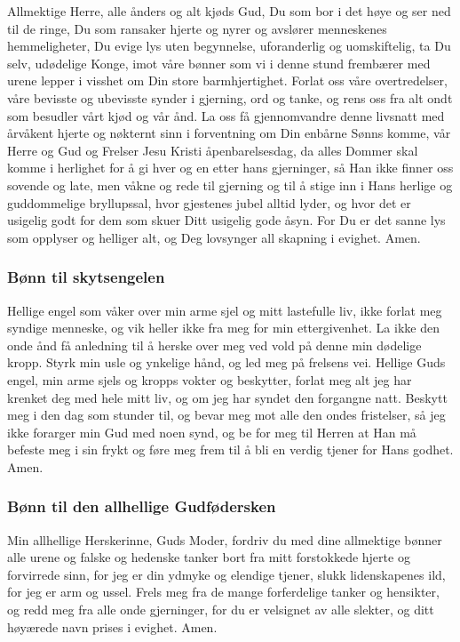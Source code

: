 Allmektige Herre, alle ånders og alt kjøds Gud, Du som bor i det høye og ser ned til de ringe, Du som ransaker hjerte og nyrer og avslører menneskenes hemmeligheter, Du evige lys uten begynnelse, uforanderlig og uomskiftelig, ta Du selv, udødelige Konge, imot våre bønner som vi i denne stund frembærer med urene lepper i visshet om Din store barmhjertighet. Forlat oss våre overtredelser, våre bevisste og ubevisste synder i gjerning, ord og tanke, og rens oss fra alt ondt som besudler vårt kjød og vår ånd. La oss få gjennomvandre denne livsnatt med årvåkent hjerte og nøkternt sinn i forventning om Din enbårne Sønns komme, vår Herre og Gud og Frelser Jesu Kristi åpenbarelsesdag, da alles Dommer skal komme i herlighet for å gi hver og en etter hans gjerninger, så Han ikke finner oss sovende og late, men våkne og rede til gjerning og til å stige inn i Hans herlige og guddommelige bryllupssal, hvor gjestenes jubel alltid lyder, og hvor det er usigelig godt for dem som skuer Ditt usigelig gode åsyn. For Du er det sanne lys som opplyser og helliger alt, og Deg lovsynger all skapning i evighet. Amen.

\subsubsection{Bønn til skytsengelen }

Hellige engel som våker over min arme sjel og mitt lastefulle liv, ikke forlat meg syndige menneske, og vik heller ikke fra meg for min ettergivenhet. 
La ikke den onde ånd få anledning til å herske over meg ved vold på denne min dødelige kropp. Styrk min usle og ynkelige hånd, og led meg på frelsens vei. Hellige Guds engel, min arme sjels og kropps vokter og beskytter, forlat meg alt jeg har krenket deg med hele mitt liv, og om jeg har syndet den forgangne natt. Beskytt meg i den dag som stunder til, og bevar meg mot alle den ondes fristelser, så jeg ikke forarger min Gud med noen synd, og be for meg til Herren at Han må befeste meg i sin frykt og føre meg frem til å bli en verdig tjener for Hans godhet. Amen. 

\subsubsection{Bønn til den allhellige Gudfødersken}

Min allhellige Herskerinne, Guds Moder, fordriv du med dine allmektige bønner alle urene og falske og hedenske tanker bort fra mitt forstokkede hjerte og forvirrede sinn, for jeg er din ydmyke og elendige tjener, slukk lidenskapenes ild, for jeg er arm og ussel. Frels meg fra de mange forferdelige tanker og hensikter, og redd meg fra alle onde gjerninger, for du er velsignet av alle slekter, og ditt høyærede navn prises i evighet. Amen. 

